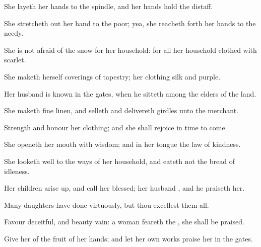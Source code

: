 {She
layeth her
hands to the
spindle, and her
hands
hold the
distaff.

She stretcheth
out her
hand to the
poor; yea, she reacheth
forth her
hands to the
needy.

She is not
afraid of the
snow for her
household: for all her
household
{}
clothed with
scarlet.

She
maketh herself coverings of
tapestry; her
clothing
{}
silk and
purple.

Her
husband is
known in the
gates, when he
sitteth among the
elders of the
land.

She
maketh fine
linen, and
selleth
{} and
delivereth
girdles unto the
merchant.

Strength and
honour
{} her
clothing; and she shall
rejoice in
time to
come.

She
openeth her
mouth with
wisdom; and in her
tongue
{} the
law of
kindness.

She looketh
well to the
ways of her
household, and
eateth not the
bread of
idleness.

Her
children arise
up, and call her
blessed; her
husband
{}, and he
praiseth her.

Many
daughters have
done
virtuously, but thou
excellest them all.

Favour
{}
deceitful, and
beauty
{}
vain:
{} a
woman
{}
feareth the
{}, she shall be
praised.

Give her of the
fruit of her
hands; and let her own
works
praise her in the
gates.


\par }